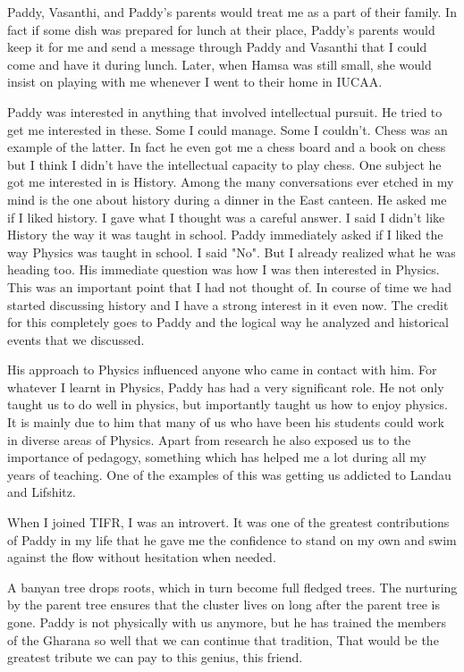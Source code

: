 \documentclass[prd, preprint, longbibliography, 11pt]{revtex4-1}
\begin{document}
Paddy, Vasanthi, and Paddy's parents would treat me as a part of their family. In fact if some dish was prepared for lunch at their place, Paddy's parents would keep it for me and send a message through Paddy and Vasanthi that I could come and have it during lunch. Later, when Hamsa was still small, she would insist on playing with me whenever I went to their home in IUCAA.

Paddy was interested in anything that involved intellectual pursuit. He tried to get me interested in these. Some I could manage. Some I couldn't. Chess was an example of the latter. In fact he even got me a chess board and a book on chess but I think I didn't have the intellectual capacity to play chess. One subject he got me interested in is History. Among the many conversations ever etched in my mind is the one about history during a dinner in the East canteen. He asked me if I liked history. I gave what I thought was a careful answer. I said I didn't like History the way it was taught in school. Paddy immediately asked if I liked the way Physics was taught in school. I said "No". But I already realized what he was heading too. His immediate question was how I was then interested in Physics. This was an important point that I had not thought of. In course of time we had started discussing history and I have a strong interest in it even now. The credit for this completely goes to Paddy and the logical way he analyzed and historical events that we discussed.

His approach to Physics influenced anyone who came in contact with him. For whatever I learnt in Physics, Paddy has had a very significant role. He not only taught us to do well in physics, but importantly taught us how to enjoy physics. It is mainly due to him that many of us who have been his students could work in diverse areas of Physics. Apart from research he also exposed us to the importance of pedagogy, something which has helped me a lot during all my years of teaching. One of the examples of this was getting us addicted to Landau and Lifshitz.

When I joined TIFR, I was an introvert. It was one of the greatest contributions of Paddy in my life that he gave me the confidence to stand on my own and swim against the flow without hesitation when needed.

A banyan tree drops roots, which in turn become full fledged trees. The nurturing by the parent tree ensures that the cluster lives on long after the parent tree is gone. Paddy is not physically with us anymore, but he has trained the members of the Gharana so well that we can continue that tradition, That would be the greatest tribute we can pay to this genius, this friend.
\end{document}
